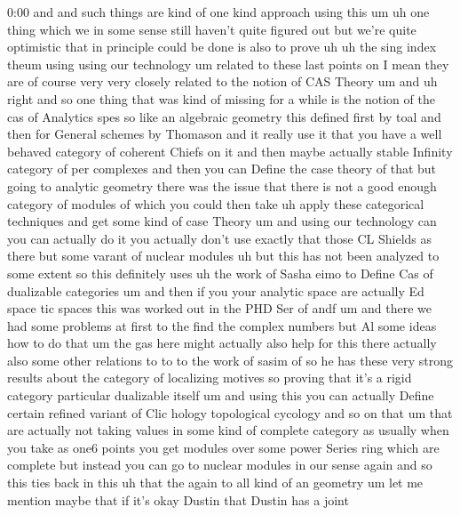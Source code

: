 \begin{unfinished}{0:00}
and  and  such  things  are  kind
of  one  kind  approach  using  this
um  uh  one  thing  which  we  in  some  sense
still  haven't  quite  figured  out  but
we're  quite  optimistic  that  in  principle
could  be  done  is  also  to  prove
uh  uh  the  sing  index  theum  using  using
our
technology
um  related  to  these  last  points  on  I
mean  they  are  of  course  very  very
closely  related  to  the  notion  of  CAS
Theory  um
and  uh  right  and  so  one  thing  that  was
kind  of  missing  for  a  while  is  the
notion  of  the  cas  of  Analytics
spes
so  like  an  algebraic  geometry  this
defined  first  by  toal  and  then  for
General  schemes  by  Thomason  and  it
really  use  it  that  you  have  a  well
behaved  category  of  coherent  Chiefs  on
it  and  then  maybe  actually  stable
Infinity  category  of  per  complexes  and
then  you  can  Define  the  case  theory  of
that
but  going  to  analytic  geometry  there  was
the  issue  that  there  is  not  a  good
enough  category  of  modules  of  which  you
could  then  take  uh  apply  these
categorical  techniques  and  get  some  kind
of  case  Theory
um  and  using  our  technology  can  you  can
actually  do  it  you  actually  don't  use
exactly  that  those  CL  Shields  as  there
but  some  varant  of  nuclear  modules  uh
but  this  has  not  been  analyzed  to  some
extent  so  this  definitely
uses  uh  the  work  of  Sasha  eimo  to  Define
Cas  of  dualizable  categories  um  and  then
if  you  your  analytic  space  are  actually
Ed  space
tic  spaces  this  was  worked  out  in  the
PHD  Ser
of
andf  um  and
there  we  had  some  problems  at  first  to
the  find  the  complex  numbers  but  Al  some
ideas  how  to  do  that  um  the  gas  here
might  actually  also  help  for
this  there  actually  also  some  other
relations  to  to  to  the  work  of  sasim  of
so  he  has  these  very  strong  results
about  the  category  of  localizing  motives
so  proving  that  it's  a  rigid  category
particular  dualizable  itself  um  and
using  this  you  can  actually  Define
certain  refined  variant  of  Clic  hology
topological  cycology  and  so  on  that  um
that  are  actually  not  taking  values  in
some  kind  of  complete  category  as
usually  when  you  take  as  one6  points  you
get  modules  over  some  power  Series  ring
which  are  complete  but  instead  you  can
go  to  nuclear  modules  in  our  sense  again
and  so  this  ties  back  in  this  uh  that
the  again  to  all  kind  of  an
geometry  um  let  me  mention  maybe  that  if
it's  okay  Dustin  that  Dustin  has  a  joint

\end{unfinished}

